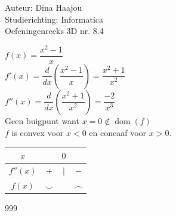 \documentclass[a4paper]{article}
\begin{document}
   

\noindent \large Auteur: Dina Haajou \\
\noindent \large Studierichting: Informatica \\
\noindent \large Oefeningenreeks 3D nr. 8.4 \\

\medskip

\normalsize

$f(x) = \dfrac{x^2 - 1}{x}$ \\

$f'(x) = \dfrac{d}{dx} \left( \dfrac{x^2 - 1}{x} \right) = \dfrac{x^2 + 1}{x^2}$ \\

$f''(x) = \dfrac{d}{dx} \left( \dfrac{x^2 + 1}{x^2} \right) = \dfrac{-2}{x^3}$ \\

Geen buigpunt want $x = 0 \notin \operatorname{dom}(f)$ \\

$f$ is convex voor $x < 0$ en concaaf voor $x > 0$. \\

\begin{center}
\begin{tabular}{c|ccc}
$x$ &       & $0$ &       \\ \hline
$f''(x)$ & $+$ & $|$ & $-$ \\
$f(x)$   & $\smile$ &     & $\frown$ \\
\end{tabular}
\end{center}

\begin{thebibliography}{999}
\end{thebibliography}
\end{document}
